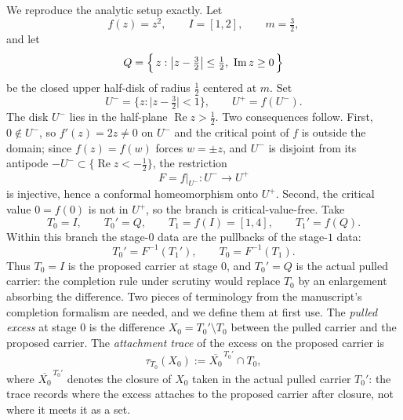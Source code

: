 \documentclass[11pt,reqno]{amsart}
\theoremstyle{definition}
\theoremstyle{remark}
\begin{document}
We reproduce the analytic setup exactly. Let
\[
f(z)=z^{2},\qquad I=[1,2],\qquad m=\tfrac32,
\]
and let
\begin{equation}\label{eq:B-Q}
Q=\Bigl\{\,z:\bigl|z-\tfrac32\bigr|\le\tfrac12,\ \operatorname{Im}z\ge 0\,\Bigr\}
\end{equation}
be the closed upper half-disk of radius $\tfrac12$ centered at $m$. Set
\[
U^{-}=\bigl\{z:\bigl|z-\tfrac32\bigr|<1\bigr\},
\qquad
U^{+}=f(U^{-}).
\]
The disk $U^{-}$ lies in the half-plane $\operatorname{Re}z>\tfrac12$. Two
consequences follow. First, $0\notin U^{-}$, so $f'(z)=2z\ne 0$ on $U^{-}$
and the critical point of $f$ is outside the domain; since $f(z)=f(w)$ forces
$w=\pm z$, and $U^{-}$ is disjoint from its antipode
$-U^{-}\subset\{\operatorname{Re}z<-\tfrac12\}$, the restriction
\begin{equation}\label{eq:B-branch}
F=f|_{U^{-}}:U^{-}\longrightarrow U^{+}
\end{equation}
is injective, hence a conformal homeomorphism onto $U^{+}$. Second, the
critical value $0=f(0)$ is not in $U^{+}$, so the branch is
critical-value-free. Take
\begin{equation}\label{eq:B-stages}
T_0=I,\qquad T_0'=Q,\qquad T_1=f(I)=[1,4],\qquad T_1'=f(Q).
\end{equation}
Within this branch the stage-$0$ data are the pullbacks of the stage-$1$
data:
\begin{equation}\label{eq:B-pullback}
T_0'=F^{-1}(T_1'),\qquad T_0=F^{-1}(T_1).
\end{equation}
Thus $T_0=I$ is the proposed carrier at stage $0$, and $T_0'=Q$ is the actual
pulled carrier: the completion rule under scrutiny would replace $T_0$ by an
enlargement absorbing the difference. Two pieces of terminology from the
manuscript's completion formalism are needed, and we define them at first
use. The \emph{pulled excess} at stage $0$ is the difference
$X_0=T_0'\setminus T_0$ between the pulled carrier and the proposed carrier.
The \emph{attachment trace} of the excess on the proposed carrier is
\begin{equation}\label{eq:B-trace}
\tau_{T_0}(X_0):=\overline{X_0}^{\,T_0'}\cap T_0,
\end{equation}
where $\overline{X_0}^{\,T_0'}$ denotes the closure of $X_0$ taken in the
actual pulled carrier $T_0'$: the trace records where the excess attaches to
the proposed carrier after closure, not where it meets it as a set.
\end{document}
